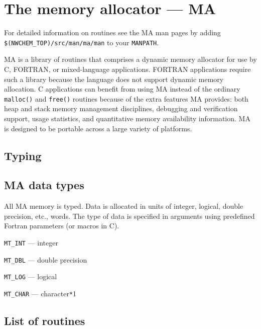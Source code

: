 \section{The memory allocator --- MA}

\sloppy
For detailed information on routines see the MA man pages by adding
{\tt \$(NWCHEM\_TOP)/src/man/ma/man} %
to your {\tt MANPATH}.

\fussy

MA is a library of routines that comprises a dynamic memory allocator
for use by C, FORTRAN, or mixed-language applications.  FORTRAN
applications require such a library because the language does not
support dynamic memory allocation.  C applications can benefit from
using MA instead of the ordinary {\tt malloc()} and {\tt free()}
routines because of the extra features MA provides: both heap and
stack memory management disciplines, debugging and verification
support, usage statistics, and quantitative memory availability
information.  MA is designed to be portable across a large variety of
platforms.

\subsection{Typing}

\subsection{MA data types}

All MA memory is typed.  Data is allocated in units of integer,
logical, double precision, etc., words.  The type of data is specified
in arguments using predefined Fortran parameters (or macros in C).
\begin{description}
\item{\verb+MT_INT+} --- integer
\item{\verb+MT_DBL+} --- double precision
\item{\verb+MT_LOG+} --- logical
\item{\verb+MT_CHAR+} --- character\verb+*+1
\end{description}

\subsection{List of routines}

